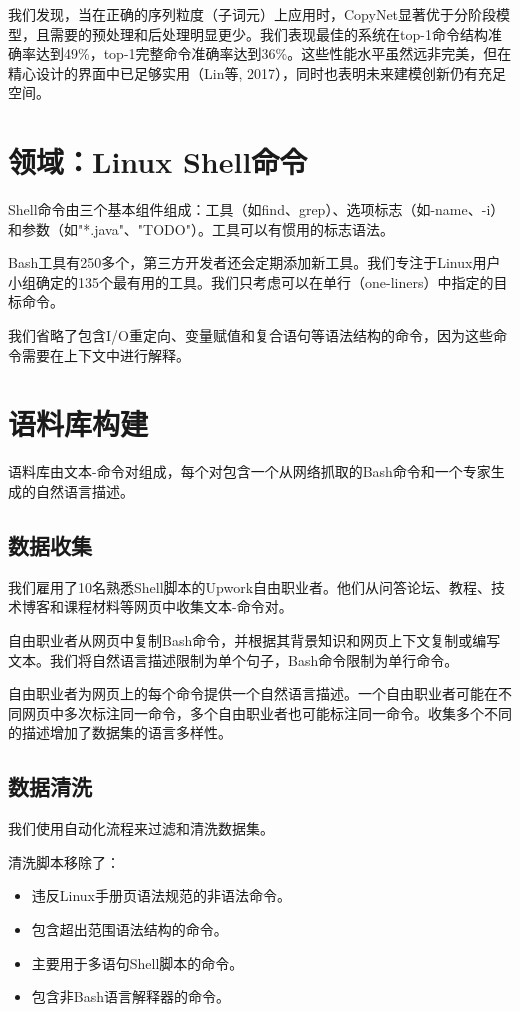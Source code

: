 我们发现，当在正确的序列粒度（子词元）上应用时，CopyNet显著优于分阶段模型，且需要的预处理和后处理明显更少。我们表现最佳的系统在top-1命令结构准确率达到49\%，top-1完整命令准确率达到36\%。这些性能水平虽然远非完美，但在精心设计的界面中已足够实用（Lin等, 2017），同时也表明未来建模创新仍有充足空间。

\section{领域：Linux Shell命令}

Shell命令由三个基本组件组成：工具（如find、grep）、选项标志（如-name、-i）和参数（如"*.java"、"TODO"）。工具可以有惯用的标志语法。

Bash工具有250多个，第三方开发者还会定期添加新工具。我们专注于Linux用户小组确定的135个最有用的工具。我们只考虑可以在单行（one-liners）中指定的目标命令。

我们省略了包含I/O重定向、变量赋值和复合语句等语法结构的命令，因为这些命令需要在上下文中进行解释。

\section{语料库构建}

语料库由文本-命令对组成，每个对包含一个从网络抓取的Bash命令和一个专家生成的自然语言描述。

\subsection{数据收集}

我们雇用了10名熟悉Shell脚本的Upwork自由职业者。他们从问答论坛、教程、技术博客和课程材料等网页中收集文本-命令对。

自由职业者从网页中复制Bash命令，并根据其背景知识和网页上下文复制或编写文本。我们将自然语言描述限制为单个句子，Bash命令限制为单行命令。

自由职业者为网页上的每个命令提供一个自然语言描述。一个自由职业者可能在不同网页中多次标注同一命令，多个自由职业者也可能标注同一命令。收集多个不同的描述增加了数据集的语言多样性。

\subsection{数据清洗}

我们使用自动化流程来过滤和清洗数据集。

清洗脚本移除了：

\begin{itemize}
    \item 违反Linux手册页语法规范的非语法命令。
    \item 包含超出范围语法结构的命令。
    \item 主要用于多语句Shell脚本的命令。
    \item 包含非Bash语言解释器的命令。
\end{itemize}

